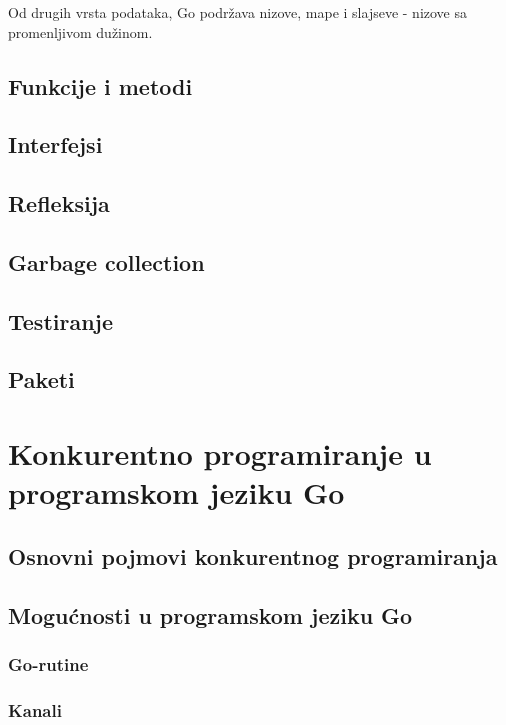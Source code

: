 \documentclass[12pt,oneside]{memoir}
\begin{document}
Od drugih vrsta podataka, Go podržava nizove, mape i slajseve - nizove sa promenljivom dužinom. 

\section{Funkcije i metodi}
 
\section{Interfejsi}

\section{Refleksija}

\section{Garbage collection}

\section{Testiranje}

\section{Paketi}


\chapter{Konkurentno programiranje u programskom jeziku Go}

\section{Osnovni pojmovi konkurentnog programiranja}

\section{Mogućnosti u programskom jeziku Go}

\subsection{Go-rutine}

\subsection{Kanali}
\end{document}
